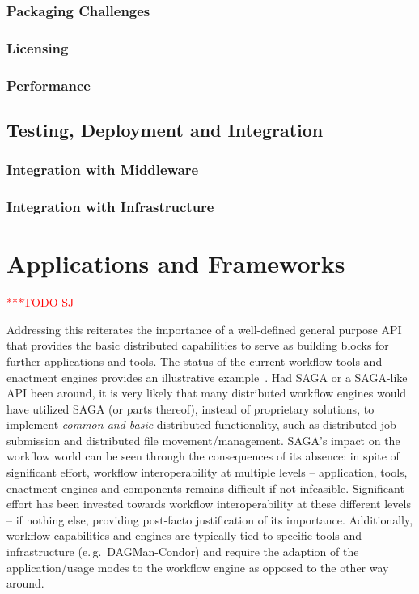 \documentclass[a4paper,12pt]{article}
\newcommand{\todo}[1]{     {\textcolor{red}  { ***TODO      #1 }}}
\newcommand{\todo}[1]{}
\begin{document}
\subsubsection{Packaging Challenges}

\subsubsection{Licensing}

\subsubsection{Performance}



\subsection{Testing, Deployment and Integration} 



\subsubsection{Integration with Middleware}
\subsubsection{Integration with Infrastructure}



% 
\section{Applications and Frameworks}\todo{SJ}
\label{apps_and_frameworks}


Addressing this reiterates the importance of a well-defined general
purpose API that provides the basic distributed capabilities to serve
as building blocks for further applications and tools. The status of
the current workflow tools and enactment engines provides an
illustrative example~\cite{nsf-workflow,1196459}. Had SAGA or a
SAGA-like API been around, it is very likely that many distributed
workflow engines would have utilized SAGA (or parts thereof), instead
of proprietary solutions, to implement {\it common and basic}
distributed functionality, such as distributed job submission and
distributed file movement/management. SAGA's impact on the workflow
world can be seen through the consequences of its absence: in spite of
significant effort, workflow interoperability at multiple levels --
application, tools, enactment engines and components remains difficult
if not infeasible.  Significant effort has been invested towards
workflow interoperability at these different levels -- if nothing
else, providing post-facto justification of its importance.
Additionally, workflow capabilities and engines are typically tied to
specific tools and infrastructure (e.\,g.\ DAGMan-Condor) and require
the adaption of the application/usage modes to the workflow engine as
opposed to the other way around.
\end{document}
